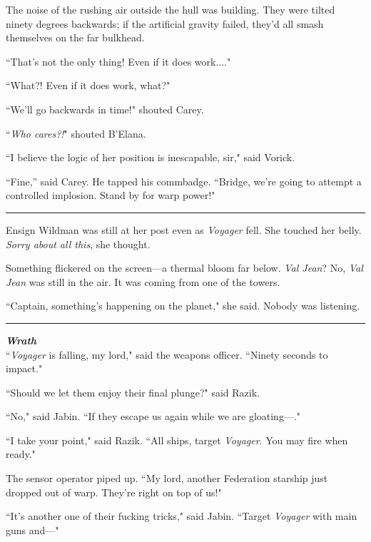 \documentclass[twoside,letterpaper,12pt]{memoir}
\begin{document}
The noise of the rushing air outside the hull was building. They were tilted ninety degrees backwards; if the artificial gravity failed, they'd all smash themselves on the far bulkhead.

``That's not the only thing! Even if it does work...."

``What?! Even if it does work, what?"

``We'll go backwards in time!" shouted Carey.

``\textit{Who cares?!}" shouted B'Elana.

``I believe the logic of her position is inescapable, sir," said Vorick.

“Fine,” said Carey. He tapped his commbadge. ``Bridge, we're going to attempt a controlled implosion. Stand by for warp power!"

\begin{center}\rule{3cm}{0.4 pt}\end{center}

Ensign Wildman was still at her post even as \textit{Voyager} fell. She touched her belly. \textit{Sorry about all this}, she thought.

Something flickered on the screen---a thermal bloom far below. \textit{Val Jean}? No, \textit{Val Jean} was still in the air. It was coming from one of the towers.

``Captain, something's happening on the planet," she said. Nobody was listening.

\begin{center}\rule{3cm}{0.4 pt}\end{center}

\noindent\textit{\textbf{Wrath}}\\

``\textit{Voyager} is falling, my lord," said the weapons officer. ``Ninety seconds to impact."

``Should we let them enjoy their final plunge?" said Razik.

``No," said Jabin. ``If they escape us again while we are gloating---."

``I take your point," said Razik. ``All ships, target \textit{Voyager}. You may fire when ready."

The sensor operator piped up. ``My lord, another Federation starship just dropped out of warp. They're right on top of us!"

``It's another one of their fucking tricks," said Jabin. ``Target \textit{Voyager} with main guns and---"
\end{document}
